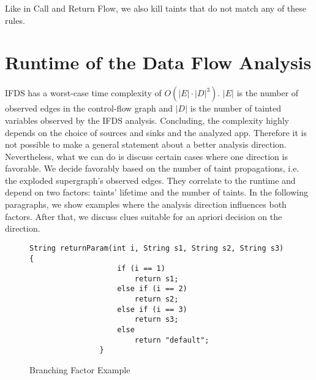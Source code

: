 \documentclass[../draft.tex]{subfiles}
\begin{document}
    Like in Call and Return Flow, we also kill taints that do not match any of these rules.
    
    \section{Runtime of the Data Flow Analysis}\label{s:complexity}
    IFDS has a worst-case time complexity of $O(|E| \cdot |D|^3)$. $|E|$ is the number of observed edges in the control-flow graph and $|D|$ is the number of tainted variables observed by the IFDS analysis. Concluding, the complexity highly depends on the choice of sources and sinks and the analyzed app. 
    Therefore it is not possible to make a general statement about a better analysis direction. 
    Nevertheless, what we can do is discuss certain cases where one direction is favorable. We decide favorably based on the number of taint propagations, i.e. the exploded supergraph's observed edges. They correlate to the runtime and depend on two factors: taints' lifetime and the number of taints. In the following paragraphs, we show examples where the analysis direction influences both factors. After that, we discuss clues suitable for an apriori decision on the direction.

    \begin{figure}[ht]
        \centering
        \begin{adjustbox}{max width=\textwidth}
            \begin{lstlisting}[gobble=16]
                String returnParam(int i, String s1, String s2, String s3) {
                    if (i == 1)
                        return s1;
                    else if (i == 2)
                        return s2;
                    else if (i == 3)
                        return s3;
                    else
                        return "default";
                }
            \end{lstlisting}    
        \end{adjustbox}
        \caption{Branching Factor Example}
        \label{lst:branching}
    \end{figure}
\end{document}
